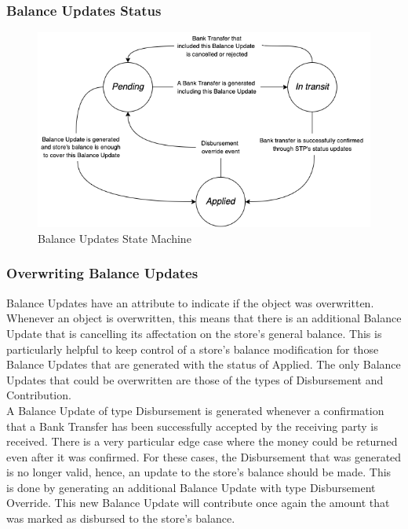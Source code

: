 \subsubsection{Balance Updates Status}

\begin{figure} [!htb]
    \centering
    \includegraphics[scale = 0.7]{assets/diagrams/BalanceUpdatesStateMachine.png}
    \caption{Balance Updates State Machine}\label{fig:state_machine_balance_updates}
\end{figure}


\subsubsection{Overwriting Balance Updates}


Balance Updates have an attribute to indicate if the object was overwritten. Whenever an object is overwritten, this means that there is an additional Balance Update that is cancelling its affectation on the store’s general balance. This is particularly helpful to keep control of a store’s balance modification for those Balance Updates that are generated with the status of Applied. The only Balance Updates that could be overwritten are those of the types of Disbursement and Contribution.\\

A Balance Update of type Disbursement is generated whenever a confirmation that a Bank Transfer has been successfully accepted by the receiving party is received. There is a very particular edge case where the money could be returned even after it was confirmed. For these cases, the Disbursement that was generated is no longer valid, hence, an update to the store’s balance should be made. This is done by generating an additional Balance Update with type Disbursement Override. This new Balance Update will contribute once again the amount that was marked as disbursed to the store’s balance.\\

